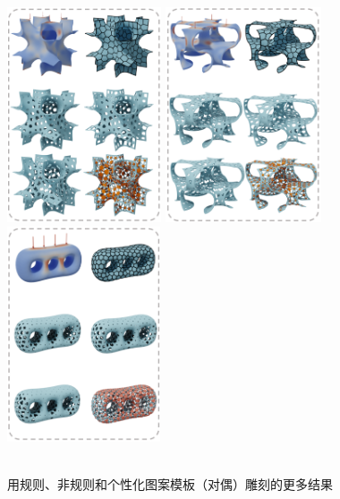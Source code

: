 \begin{figure}[htbp]
    \centering
    \includegraphics[height=2.5in]{./figures/fig-moreresults_a.png}
    \includegraphics[height=2.5in]{./figures/fig-moreresults_b.png}
    \includegraphics[height=2.5in]{./figures/fig-moreresults_c.png}\\
    \\
    \caption{用规则、非规则和个性化图案模板（对偶）雕刻的更多结果}
    \label{fig-moreresults}
\end{figure}

